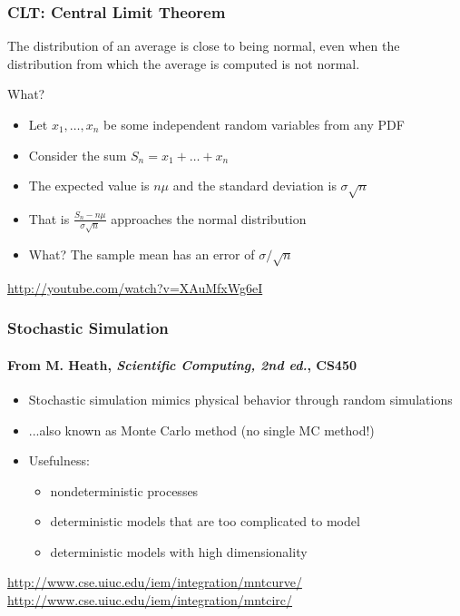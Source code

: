 \documentclass[10pt]{beamer}
\begin{document}
\begin{frame}
\frametitle{CLT: Central Limit Theorem}
\begin{block}{}
  The distribution of an average is close to being normal, even when the distribution from which the average is computed is not normal.
\end{block}
What?
\begin{itemize}
  \item Let $x_1,\dots,x_n$ be some independent random variables from any PDF
  \item Consider the sum $S_n = x_1 + \dots + x_n$
  \item The expected value is $n\mu$ and the standard deviation is
$\sigma \sqrt{n}$
  \item That is $\frac{S_n - n\mu}{\sigma\sqrt{n}}$ approaches the
normal distribution
  \item What?  The sample mean has an error of $\sigma/\sqrt{n}$
\end{itemize}
\bigskip

\url{http://youtube.com/watch?v=XAuMfxWg6eI}


\end{frame}
\begin{frame}
\frametitle{Stochastic Simulation}
\framesubtitle{From M. Heath, \emph{Scientific Computing, 2nd ed.}, CS450}
\begin{itemize}
    \item Stochastic simulation mimics physical behavior through random
simulations
    \item ...also known as Monte Carlo method (no single MC method!)
    \item Usefulness:
    \begin{itemize}
    \item nondeterministic processes
    \item deterministic models that are too complicated to model
    \item deterministic models with high dimensionality
    \end{itemize}
\end{itemize}
\bigskip

\url{http://www.cse.uiuc.edu/iem/integration/mntcurve/}
\url{http://www.cse.uiuc.edu/iem/integration/mntcirc/}
\end{frame}
\end{document}
